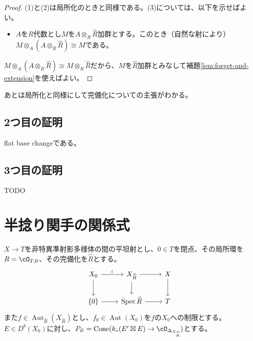 \documentclass[uplatex, a4paper, dvipdfmx]{jsarticle}
\theoremstyle{definition}
\DeclareMathOperator{\Cone}{\mathrm{Cone}}
\DeclareMathOperator{\Aut}{\mathrm{Aut}}
\DeclareMathOperator{\Spec}{\mathrm{Spec}}
\begin{document}
\begin{proof}
    (1)と(2)は局所化のときと同様である。(3)については、以下を示せばよい。
    \begin{itemize}
        \item $A$を$R$代数とし$M$を$A \otimes_R \widehat{R}$加群とする。このとき（自然な射により）$M \otimes_A (A \otimes_R \widehat{R}) \cong M$である。
    \end{itemize}
    $M \otimes_A (A \otimes_R \widehat{R}) \cong M \otimes_R \widehat{R}$だから、$M$を$\widehat{R}$加群とみなして補題\ref{lem:forget-and-extension}を使えばよい。
\end{proof}
あとは局所化と同様にして完備化についての主張がわかる。
\subsection{2つ目の証明}
flat base changeである。
\subsection{3つ目の証明}
TODO
\section{半捻り関手の関係式}
$X \to T$を非特異準射影多様体の間の平坦射とし、$0 \in T$を閉点、その局所環を$R = \cO_{T, 0}$、その完備化を$\widehat{R}$とする。
\[
    \begin{tikzcd}
        X_0 \ar[r, "i"] \ar[d]&X_{\widehat{R}} \ar[r] \ar[d]& X \ar[d]\\
        \{0\} \ar[r]& \Spec \widehat{R} \ar[r] & T
    \end{tikzcd}
\]
また$f \in \Aut_{\widehat{R}}(X_{\widehat{R}})$とし、$f_0 \in \Aut(X_0)$を$f$の$X_0$への制限とする。$E \in D^b(X_0)$に対し、$P_E = \Cone(k_*(E' \boxtimes E) \to \cO_{\Delta_{X_{\widehat{R}}}})$とする。
\end{document}
